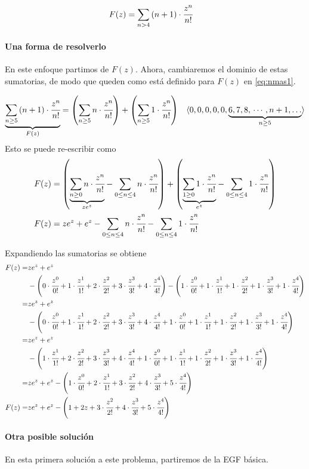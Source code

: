 \begin{align}
\label{eq:nmas1}
F(z)&=\sum_{n>4}{\left(n+1\right)}\cdot\cfrac{z^{n}}{n!}
\end{align}

\paragraph{Una forma de resolverlo}
En este enfoque partimos de $F(z)$.
Ahora, cambiaremos el dominio de estas sumatorias, de modo que queden como está definido para $F(z)$ en \eqref{eq:nmas1}.

\begin{align*}
\underset{F(z)}{\underbrace{\sum_{n\geq5}{(n+1)\cdot \cfrac{z^{n}}{n!}}}}&=\left(\sum_{n\geq5}{n\cdot \cfrac{z^{n}}{n!}}\right)+\left(\sum_{n\geq5}{1\cdot \cfrac{z^{n}}{n!}}\right)&\langle 0, 0,0,0,0,\underset{n\geq5}{\underbrace{6,7,8,\,\cdots,n+1,\dots}}\rangle
\end{align*}
Esto se puede re-escribir como
\begin{align*}
F(z)&=\left(\underset{ze^z}{\underbrace{\sum_{n\geq0}{n\cdot \cfrac{z^{n}}{n!}}}}-\sum_{0\leq n\leq 4}{n\cdot\cfrac{z^{n}}{n!}}\right)+\left(\underset{e^z}{\underbrace{\sum_{1\geq0}{1\cdot \cfrac{z^{n}}{n!}}}}-\sum_{0\leq n\leq 4}{1\cdot\cfrac{z^{n}}{n!}}\right)\\
F(z)&=ze^z+e^z-\sum_{0\leq n\leq 4}{n\cdot\cfrac{z^{n}}{n!}}-\sum_{0\leq n\leq 4}{1\cdot\cfrac{z^{n}}{n!}}
\end{align*}

Expandiendo las sumatorias se obtiene
\begin{align*}
F(z)=&ze^z+e^z\\&-\left(0\cdot\cfrac{z^{0}}{0!}+1\cdot\cfrac{z^{1}}{1!}+2\cdot\cfrac{z^{2}}{2!}+3\cdot\cfrac{z^{3}}{3!}+4\cdot\cfrac{z^{4}}{4!}\right)
-\left(1\cdot\cfrac{z^{0}}{0!}+1\cdot\cfrac{z^{1}}{1!}+1\cdot\cfrac{z^{2}}{2!}+1\cdot\cfrac{z^{3}}{3!}+1\cdot\cfrac{z^{4}}{4!}\right)\\
=&ze^z+e^z\\&-\left(0\cdot\cfrac{z^{0}}{0!}+1\cdot\cfrac{z^{1}}{1!}+2\cdot\cfrac{z^{2}}{2!}+3\cdot\cfrac{z^{3}}{3!}+4\cdot\cfrac{z^{4}}{4!}
+1\cdot\cfrac{z^{0}}{0!}+1\cdot\cfrac{z^{1}}{1!}+1\cdot\cfrac{z^{2}}{2!}+1\cdot\cfrac{z^{3}}{3!}+1\cdot\cfrac{z^{4}}{4!}\right)\\
=&ze^z+e^z\\&-\left(1\cdot\cfrac{z^{1}}{1!}+2\cdot\cfrac{z^{2}}{2!}+3\cdot\cfrac{z^{3}}{3!}+4\cdot\cfrac{z^{4}}{4!}
+1\cdot\cfrac{z^{0}}{0!}+1\cdot\cfrac{z^{1}}{1!}+1\cdot\cfrac{z^{2}}{2!}+1\cdot\cfrac{z^{3}}{3!}+1\cdot\cfrac{z^{4}}{4!}\right)\\
=&ze^z+e^z-
\left(1\cdot\cfrac{z^{0}}{0!}+2\cdot\cfrac{z^{1}}{1!}+3\cdot\cfrac{z^{2}}{2!}+4\cdot\cfrac{z^{3}}{3!}+5\cdot\cfrac{z^{4}}{4!}\right)\\
F(z)=&ze^z+e^z-\left(1+2z+3\cdot\cfrac{z^{2}}{2!}+4\cdot\cfrac{z^{3}}{3!}+5\cdot\cfrac{z^{4}}{4!}\right)
\end{align*}

\paragraph{Otra posible solución}
En esta primera solución a este problema, partiremos de la EGF básica.

